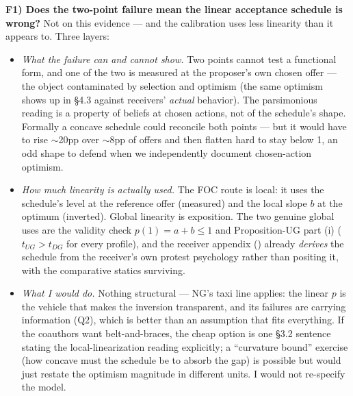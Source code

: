 \documentclass[11pt]{article}
\newcommand{\code}[1]{\path{#1}}
\begin{document}
\textbf{F1) Does the two-point failure mean the linear acceptance schedule is wrong?} Not on this evidence --- and the calibration uses less linearity than it appears to. Three layers:
\begin{itemize}
\item \emph{What the failure can and cannot show.} Two points cannot test a functional form, and one of the two is measured at the proposer's own chosen offer --- the object contaminated by selection and optimism (the same optimism shows up in \S4.3 against receivers' \emph{actual} behavior). The parsimonious reading is a property of beliefs at chosen actions, not of the schedule's shape. Formally a concave schedule could reconcile both points --- but it would have to rise $\sim$20pp over $\sim$8pp of offers and then flatten hard to stay below 1, an odd shape to defend when we independently document chosen-action optimism.
\item \emph{How much linearity is actually used.} The FOC route is local: it uses the schedule's level at the reference offer (measured) and the local slope $b$ at the optimum (inverted). Global linearity is exposition. The two genuine global uses are the validity check $p(1) = a+b \le 1$ and Proposition-UG part (i) ($t_{UG} > t_{DG}$ for every profile), and the receiver appendix (\code{app:receiver}) already \emph{derives} the schedule from the receiver's own protest psychology rather than positing it, with the comparative statics surviving.
\item \emph{What I would do.} Nothing structural --- NG's taxi line applies: the linear $p$ is the vehicle that makes the inversion transparent, and its failures are carrying information (Q2), which is better than an assumption that fits everything. If the coauthors want belt-and-braces, the cheap option is one \S3.2 sentence stating the local-linearization reading explicitly; a ``curvature bound'' exercise (how concave must the schedule be to absorb the gap) is possible but would just restate the optimism magnitude in different units. I would not re-specify the model.
\end{itemize}
\end{document}
